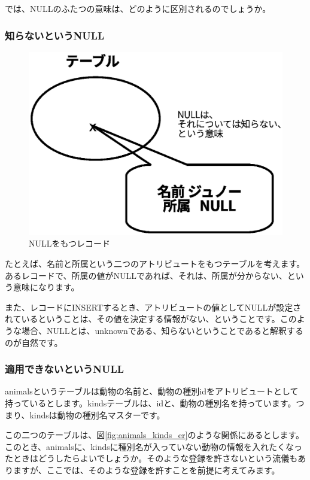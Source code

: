 では、NULLのふたつの意味は、どのように区別されるのでしょうか。

\subsubsection{知らないというNULL}

\begin{figure}[htbp]
	\includegraphics[width=12cm,clip]{draw/null.eps}
	\caption{NULLをもつレコード}
	\label{fig:record_with_null}
\end{figure}
たとえば、名前と所属という二つのアトリビュートをもつテーブルを考えます。あるレコードで、所属の値がNULLであれば、それは、所属が分からない、という意味になります。

また、レコードにINSERTするとき、アトリビュートの値としてNULLが設定されているということは、その値を決定する情報がない、ということです。このような場合、NULLとは、unknownである、知らないということであると解釈するのが自然です。

\subsubsection{適用できないというNULL}

animalsというテーブルは動物の名前と、動物の種別idをアトリビュートとして持っているとします。kindsテーブルは、idと、動物の種別名を持っています。つまり、kindsは動物の種別名マスターです。

この二つのテーブルは、図\ref{fig:animals_kinds_er}のような関係にあるとします。このとき、animalsに、kindsに種別名が入っていない動物の情報を入れたくなったときはどうしたらよいでしょうか。そのような登録を許さないという流儀もありますが、ここでは、そのような登録を許すことを前提に考えてみます。


